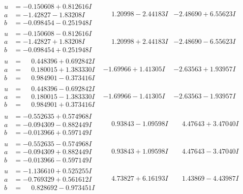 \documentclass[1p]{elsarticle_modified}
\theoremstyle{definition}
\begin{document}
$$\begin{array}{c|c|c}
\begin{aligned}
u &= -0.150608 + 0.812616 I \\
a &= -1.42827 - 1.83208 I \\
b &= -0.098454 - 0.251948 I\end{aligned}
 & \phantom{-}1.20998 - 2.44183 I & -2.48690 + 6.55623 I \\ \hline\begin{aligned}
u &= -0.150608 - 0.812616 I \\
a &= -1.42827 + 1.83208 I \\
b &= -0.098454 + 0.251948 I\end{aligned}
 & \phantom{-}1.20998 + 2.44183 I & -2.48690 - 6.55623 I \\ \hline\begin{aligned}
u &= \phantom{-}0.448396 + 0.692842 I \\
a &= \phantom{-}0.180015 + 1.383330 I \\
b &= \phantom{-}0.984901 - 0.373416 I\end{aligned}
 & -1.69966 + 1.41305 I & -2.63563 + 1.93957 I \\ \hline\begin{aligned}
u &= \phantom{-}0.448396 - 0.692842 I \\
a &= \phantom{-}0.180015 - 1.383330 I \\
b &= \phantom{-}0.984901 + 0.373416 I\end{aligned}
 & -1.69966 - 1.41305 I & -2.63563 - 1.93957 I \\ \hline\begin{aligned}
u &= -0.552635 + 0.574968 I \\
a &= -0.094309 - 0.882449 I \\
b &= -0.013966 + 0.597149 I\end{aligned}
 & \phantom{-}0.93843 - 1.09598 I & \phantom{-}4.47643 + 3.47040 I \\ \hline\begin{aligned}
u &= -0.552635 - 0.574968 I \\
a &= -0.094309 + 0.882449 I \\
b &= -0.013966 - 0.597149 I\end{aligned}
 & \phantom{-}0.93843 + 1.09598 I & \phantom{-}4.47643 - 3.47040 I \\ \hline\begin{aligned}
u &= -1.136610 + 0.525255 I \\
a &= -0.769329 + 0.561612 I \\
b &= \phantom{-}0.828692 - 0.973451 I\end{aligned}
 & \phantom{-}4.73827 + 6.16193 I & \phantom{-}1.43869 - 4.43987 I \\ \hline\begin{aligned}

\end{aligned}
\end{array}$$
\end{document}
